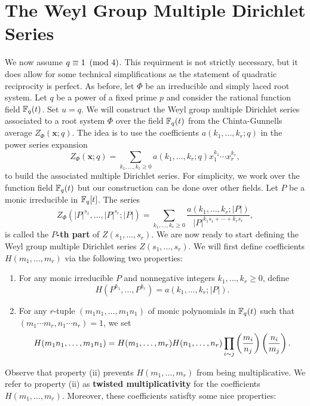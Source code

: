 \section{The Weyl Group Multiple Dirichlet Series}
    We now assume $q \equiv 1 \ \left(\text{mod }4\right)$. This requirment is not strictly necessary, but it does allow for some technical simplifications as the statement of quadratic reciprocity is perfect. As before, let $\Phi$ be an irreducible and simply laced root system. Let $q$ be a power of a fixed prime $p$ and consider the rational function field $\mathbb{F}_{q}(t)$. Set $u = q$. We will construct the Weyl group multiple Dirichlet series associated to a root system $\Phi$ over the field $\mathbb{F}_{q}(t)$ from the Chinta-Gunnells average $Z_{\Phi}(\mathbf{x};q)$. The idea is to use the coefficients $a(k_{1},\ldots,k_{r};q)$ in the power series expansion
    \[
        Z_{\Phi}(\mathbf{x};q) = \sum_{k_{1},\ldots,k_{r} \ge 0}a(k_{1},\ldots,k_{r};q)x_{1}^{k_{1}} \cdots x_{r}^{k_{r}},
    \]
    to build the associated multiple Dirichlet series. For simplicity, we work over the function field $\mathbb{F}_{q}(t)$ but our construction can be done over other fields. Let $P$ be a monic irreducible in $\mathbb{F}_{q}[t]$. The series
    \[
        Z_{\Phi}(|P|^{s_{1}},\ldots,|P|^{s_{r}};|P|) = \sum_{k_{1},\ldots,k_{r} \ge 0}\frac{a(k_{1},\ldots,k_{r};|P|)}{|P|^{k_{1}s_{1}+\cdots+k_{r}s_{r}}},
    \]
    is called the \textbf{$P$-th part} of $Z(s_{1},\ldots,s_{r})$. We are now ready to start defining the Weyl group multiple Dirichlet series $Z(s_{1},\ldots,s_{r})$. We will first define coefficients $H(m_{1},\ldots,m_{r})$ via the following two properties:
    \begin{enumerate}[label=(\roman*)]
        \item For any monic irreducible $P$ and nonnegative integers $k_{1},\ldots,k_{r} \ge 0$, define
        \[
            H(P^{k_{1}},\ldots,P^{k_{r}}) = a(k_{1},\ldots,k_{r};|P|).
        \]
        \item For any $r$-tuple $(m_{1}n_{1},\ldots,m_{1}n_{1})$ of monic polynomials in $\mathbb{F}_{q}(t)$ such that $(m_{1} \cdots m_{r},n_{1} \cdots n_{r}) = 1$, we set
        \[
            H(m_{1}n_{1},\ldots,m_{1}n_{1}) = H(m_{1},\ldots,m_{r})H(n_{1},\ldots,n_{r})\prod_{\substack{i \sim j}}\left(\frac{m_{i}}{n_{j}}\right)\left(\frac{n_{i}}{m_{j}}\right).
        \]
    \end{enumerate}

    Observe that property (ii) prevents $H(m_{1},\ldots,m_{r})$ from being multiplicative. We refer to property (ii) as \textbf{twisted multiplicativity} for the coefficients $H(m_{1},\ldots,m_{r})$. Moreover, these coefficients satisfty some nice properties:

